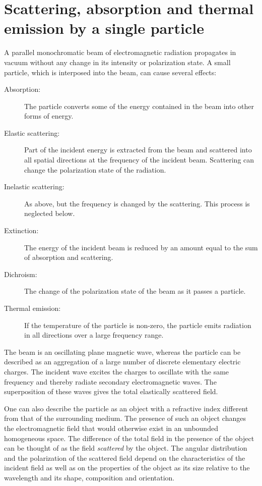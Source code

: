 \section[Single particle scattering]{Scattering, absorption and thermal emission by a single particle}
\label{sec:rtetheory:theory_single_part}

A parallel monochromatic beam of electromagnetic radiation propagates
in vacuum without any change in its intensity or polarization state. A
small particle, which is interposed into the beam, can cause several
effects:
\begin{description}
\item[Absorption:] The particle converts some of the energy
  contained in the beam into other forms of energy.
\item[Elastic scattering:] Part of the incident energy is
  extracted from the beam and scattered into all spatial directions at
  the frequency of the incident beam. Scattering can change the
  polarization state of the radiation.
\item[Inelastic scattering:] As above, but the frequency is changed by the
  scattering. This process is neglected below.
\item[Extinction:] The energy of the incident beam is reduced by
  an amount equal to the sum of absorption and scattering.
\item[Dichroism:] The change of the polarization state of the beam
  as it passes a particle.
\item[Thermal emission:] If the temperature of the particle is
  non-zero, the particle emits radiation in all directions over a
  large frequency range.
\end{description}
The beam is an oscillating plane magnetic wave, whereas the particle
can be described as an aggregation of a large number of discrete
elementary electric charges. The incident wave excites the charges to
oscillate with the same frequency and thereby radiate secondary
electromagnetic waves. The superposition of these waves gives the
total elastically scattered field.

One can also describe the particle as an object with a refractive
index different from that of the surrounding medium. The presence of
such an object changes the electromagnetic field that would otherwise
exist in an unbounded homogeneous space. The difference of the total
field in the presence of the object can be thought of as the field
\emph{scattered} by the object. The angular distribution and the
polarization of the scattered field depend on the characteristics of
the incident field as well as on the properties of the object as its
size relative to the wavelength and its shape, composition and
orientation.

